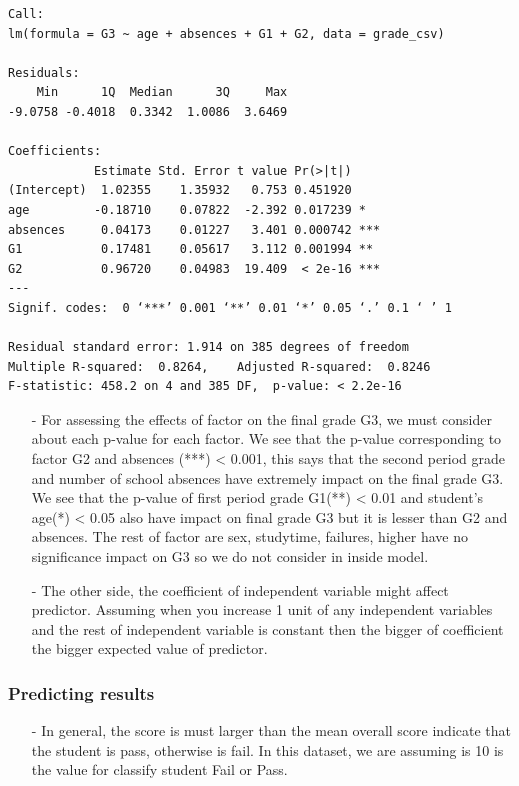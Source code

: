 \documentclass[a4paper]{article}
\numberwithin{equation}{section}
\begin{document}
\begin{mdframed}[leftline=false,rightline=false,backgroundcolor=gray!10,nobreak=true]
  \begin{verbatim}
Call:
lm(formula = G3 ~ age + absences + G1 + G2, data = grade_csv)

Residuals:
    Min      1Q  Median      3Q     Max
-9.0758 -0.4018  0.3342  1.0086  3.6469

Coefficients:
            Estimate Std. Error t value Pr(>|t|)
(Intercept)  1.02355    1.35932   0.753 0.451920
age         -0.18710    0.07822  -2.392 0.017239 *
absences     0.04173    0.01227   3.401 0.000742 ***
G1           0.17481    0.05617   3.112 0.001994 **
G2           0.96720    0.04983  19.409  < 2e-16 ***
---
Signif. codes:  0 ‘***’ 0.001 ‘**’ 0.01 ‘*’ 0.05 ‘.’ 0.1 ‘ ’ 1

Residual standard error: 1.914 on 385 degrees of freedom
Multiple R-squared:  0.8264,	Adjusted R-squared:  0.8246
F-statistic: 458.2 on 4 and 385 DF,  p-value: < 2.2e-16
  \end{verbatim}
\end{mdframed}

\begin{itemize}
  \item[-] For assessing the effects of factor on the final grade G3, we must consider about each p-value for each factor. We see that the p-value corresponding to factor G2 and absences (***) < 0.001, this says that the second period grade and number of school absences have extremely impact on the final grade G3. We see that the p-value of first period grade G1(**) < 0.01 and student's age(*) < 0.05 also have impact on final grade G3 but it is lesser than G2 and absences. The rest of factor are sex, studytime, failures, higher have no significance impact on G3 so we do not consider in inside model.

  \item[-] The other side, the coefficient of independent variable might affect predictor. Assuming when you increase 1 unit of any independent variables and the rest of independent variable is constant then the bigger of coefficient the bigger expected value of predictor.
\end{itemize}

\newpage

\subsubsection{Predicting results}
\begin{itemize}
  \item[-] In general, the score is must larger than the mean overall score indicate that the student is pass, otherwise is fail. In this dataset, we are assuming is 10 is the value for classify student Fail or Pass.
\end{itemize}
\end{document}
